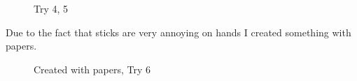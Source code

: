 \begin{figure}
	\caption{Try 4, 5}
\end{figure}

Due to the fact that sticks are very annoying on hands I created something with papers.

\begin{figure}
	\caption{Created with papers, Try 6}
\end{figure}


